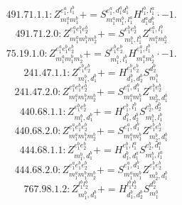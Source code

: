 \documentclass[letterpaper,10pt,fleqn,leqno,onecolumn]{article}
\begin{document}
\begin{equation} \;\;\;\;\;\;  491.71.1.1: Z^{e_{1}^{a},l_{1}^{b}}_{m_{1}^{a}m_{1}^{b}}+=S^{e_{1}^{a},d_{1}^{a}d_{1}^{b}}_{m_{1}^{a}m_{1}^{b},l_{1}^{a}}H^{l_{1}^{b},l_{1}^{a}}_{d_{1}^{a}d_{1}^{b}}\cdot -1. \end{equation}
\begin{equation} \;\;\;\;\;\;  491.71.2.0: Z^{e_{1}^{a}e_{1}^{b}e_{2}^{b}}_{m_{1}^{a}m_{1}^{b}m_{2}^{b}}+=S^{e_{1}^{b}e_{2}^{b}}_{m_{1}^{b},l_{1}^{b}}Z^{e_{1}^{a},l_{1}^{b}}_{m_{1}^{a}m_{2}^{b}} \end{equation}
\begin{equation} \;\;\;\;\;\;  75.19.1.0: Z^{e_{1}^{a}e_{1}^{b}e_{2}^{b}}_{m_{1}^{a}m_{1}^{b}m_{2}^{b}}+=S^{e_{1}^{b}e_{2}^{b}}_{m_{1}^{b},l_{1}^{b}}H^{e_{1}^{a},l_{1}^{b}}_{m_{1}^{a}m_{2}^{b}}\cdot -1. \end{equation}
\begin{equation} \;\;\;\;\;\;  241.47.1.1: Z^{e_{1}^{b}e_{2}^{b}}_{m_{1}^{b},d_{1}^{b}}+=H^{e_{1}^{b}e_{2}^{b}}_{d_{1}^{b},d_{2}^{b}}S^{d_{2}^{b}}_{m_{1}^{b}} \end{equation}
\begin{equation} \;\;\;\;\;\;  241.47.2.0: Z^{e_{1}^{a}e_{1}^{b}e_{2}^{b}}_{m_{1}^{a}m_{1}^{b}m_{2}^{b}}+=S^{e_{1}^{a},d_{1}^{b}}_{m_{1}^{a}m_{1}^{b}}Z^{e_{1}^{b}e_{2}^{b}}_{m_{2}^{b},d_{1}^{b}} \end{equation}
\begin{equation} \;\;\;\;\;\;  440.68.1.1: Z^{e_{1}^{b}e_{2}^{b}}_{m_{1}^{b},d_{1}^{b}}+=H^{e_{1}^{b},l_{1}^{b}}_{d_{1}^{b},d_{2}^{b}}S^{e_{2}^{b},d_{2}^{b}}_{m_{1}^{b},l_{1}^{b}} \end{equation}
\begin{equation} \;\;\;\;\;\;  440.68.2.0: Z^{e_{1}^{a}e_{1}^{b}e_{2}^{b}}_{m_{1}^{a}m_{1}^{b}m_{2}^{b}}+=S^{e_{1}^{a},d_{1}^{b}}_{m_{1}^{a}m_{1}^{b}}Z^{e_{1}^{b}e_{2}^{b}}_{m_{2}^{b},d_{1}^{b}} \end{equation}
\begin{equation} \;\;\;\;\;\;  444.68.1.1: Z^{e_{1}^{b}e_{2}^{b}}_{m_{1}^{b},d_{1}^{b}}+=H^{e_{1}^{b},l_{1}^{a}}_{d_{1}^{b},d_{1}^{a}}S^{e_{2}^{b},d_{1}^{a}}_{m_{1}^{b},l_{1}^{a}} \end{equation}
\begin{equation} \;\;\;\;\;\;  444.68.2.0: Z^{e_{1}^{a}e_{1}^{b}e_{2}^{b}}_{m_{1}^{a}m_{1}^{b}m_{2}^{b}}+=S^{e_{1}^{a},d_{1}^{b}}_{m_{1}^{a}m_{1}^{b}}Z^{e_{1}^{b}e_{2}^{b}}_{m_{2}^{b},d_{1}^{b}} \end{equation}
\begin{equation} \;\;\;\;\;\;  767.98.1.2: Z^{l_{1}^{b}l_{2}^{b}}_{m_{1}^{b},d_{1}^{b}}+=H^{l_{1}^{b}l_{2}^{b}}_{d_{1}^{b},d_{2}^{b}}S^{d_{2}^{b}}_{m_{1}^{b}} \end{equation}
\end{document}

